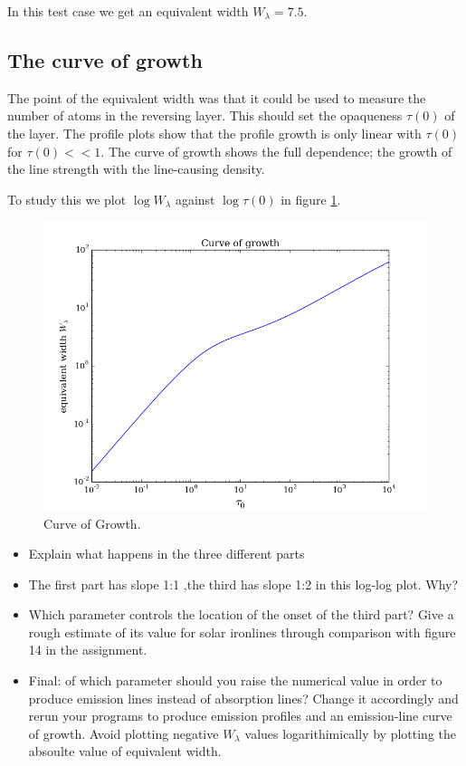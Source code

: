 \documentclass{aa}   %
\begin{document}
In this test case we get an equivalent width $W_\lambda = 7.5$.

\subsection{The curve of growth}
The point of the equivalent width was that it could be used to measure the number of atoms in the reversing layer. This should set the opaqueness $\tau(0)$ of the layer. The profile plots show that the profile growth is only linear with $\tau(0)$ for $\tau(0) <<1$. The curve of growth shows the full dependence; the growth of the line strength with the line-causing density.

To study this we plot $\log W_\lambda$ against $\log \tau(0)$ in figure \ref{growth}.

\begin{figure}[hbtp]
 \includegraphics[width=.49\textwidth]{growth.png}
 \caption{Curve of Growth.}
 \label{growth} 
\end{figure}
\begin{itemize}
 \item 
 Explain what happens in the three different parts
 \item 
 The first part has slope 1:1 ,the third has slope 1:2 in this log-log plot. Why?
 \item 
 Which parameter controls the location of the onset of the third part? Give a rough estimate of its value for solar ironlines through comparison with figure 14 in the assignment.
 \item 
 Final: of which parameter should you raise the numerical value in order to produce emission lines instead of absorption lines? Change it accordingly and rerun your programs to produce emission profiles and an emission-line curve of growth. Avoid plotting negative $W_\lambda$ values logarithimically by plotting the absoulte value of equivalent width.
\end{itemize}

\end{document}
